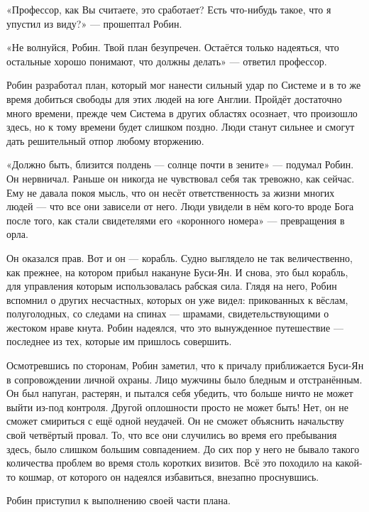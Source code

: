 \documentclass[a4paper,12pt]{book}
\begin{document}
\par
«Профессор, как Вы считаете, это сработает? Есть что-нибудь такое, что я упустил из виду?» — прошептал Робин.
\par
«Не волнуйся, Робин. Твой план безупречен. Остаётся только надеяться, что остальные хорошо понимают, что должны делать» — ответил профессор.\\
\par
Робин разработал план, который мог нанести сильный удар по Системе и в то же время добиться свободы для этих людей на юге Англии. Пройдёт достаточно много времени, прежде чем Система в других областях осознает, что произошло здесь, но к тому времени будет слишком поздно. Люди станут сильнее и смогут дать решительный отпор любому вторжению.
\par
«Должно быть, близится полдень — солнце почти в зените» — подумал Робин. Он нервничал. Раньше он никогда не чувствовал себя так тревожно, как сейчас. Ему не давала покоя мысль, что он несёт ответственность за жизни многих людей — что все они зависели от него. Люди увидели в нём кого-то вроде Бога после того, как стали свидетелями его «коронного номера» — превращения в орла.\\
\par
Он оказался прав. Вот и он — корабль. Судно выглядело не так величественно, как прежнее, на котором прибыл накануне Буси-Ян. И снова, это был корабль, для управления которым использовалась рабская сила. Глядя на него, Робин вспомнил о других несчастных, которых он уже видел: прикованных к вёслам, полуголодных, со следами на спинах — шрамами, свидетельствующими о жестоком нраве кнута. Робин надеялся, что это вынужденное путешествие — последнее из тех, которые им пришлось совершить.
\par
Осмотревшись по сторонам, Робин заметил, что к причалу приближается Буси-Ян в сопровождении личной охраны. Лицо мужчины было бледным и отстранённым. Он был напуган, растерян, и пытался себя убедить, что больше ничто не может выйти из-под контроля. Другой оплошности просто не может быть! Нет, он не сможет смириться с ещё одной неудачей. Он не сможет объяснить начальству свой четвёртый провал. То, что все они случились во время его пребывания здесь, было слишком большим совпадением. До сих пор у него не бывало такого количества проблем во время столь коротких визитов. Всё это походило на какой-то кошмар, от которого он надеялся избавиться, внезапно проснувшись.\\
\par
Робин приступил к выполнению своей части плана.
\end{document}
